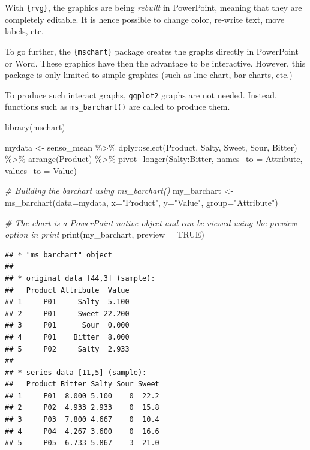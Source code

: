 \documentclass[
]{krantz}
\makeatletter
\newenvironment{Shaded}{\begin{snugshade}}{\end{snugshade}}
\newcommand{\AttributeTok}[1]{\textcolor[rgb]{0.61,0.61,0.61}{#1}}
\newcommand{\CommentTok}[1]{\textcolor[rgb]{0.37,0.37,0.37}{\textit{#1}}}
\newcommand{\ConstantTok}[1]{\textcolor[rgb]{0,0,0}{#1}}
\newcommand{\FunctionTok}[1]{\textcolor[rgb]{0,0,0}{#1}}
\newcommand{\NormalTok}[1]{#1}
\newcommand{\OtherTok}[1]{\textcolor[rgb]{0.37,0.37,0.37}{#1}}
\newcommand{\SpecialCharTok}[1]{\textcolor[rgb]{0,0,0}{#1}}
\newcommand{\StringTok}[1]{\textcolor[rgb]{0.5,0.5,0.5}{#1}}
\newenvironment{kframe}{%
\medskip{}
\setlength{\fboxsep}{.8em}
 \def\at@end@of@kframe{}%
 \ifinner\ifhmode%
  \def\at@end@of@kframe{\end{minipage}}%
  \begin{minipage}{\columnwidth}%
 \fi\fi%
 \def\FrameCommand##1{\hskip\@totalleftmargin \hskip-\fboxsep
 \colorbox{shadecolor}{##1}\hskip-\fboxsep
     \hskip-\linewidth \hskip-\@totalleftmargin \hskip\columnwidth}%
 \MakeFramed {\advance\hsize-\width
   \@totalleftmargin\z@ \linewidth\hsize
   \@setminipage}}%
 {\par\unskip\endMakeFramed%
 \at@end@of@kframe}
\renewenvironment{Shaded}{\begin{kframe}}{\end{kframe}}
\makeatother
\begin{document}
With \texttt{\{rvg\}}, the graphics are being \emph{rebuilt} in PowerPoint, meaning that they are completely editable. It is hence possible to change color, re-write text, move labels, etc.

To go further, the \texttt{\{mschart\}} package creates the graphs directly in PowerPoint or Word. These graphics have then the advantage to be interactive. However, this package is only limited to simple graphics (such as line chart, bar charts, etc.)

To produce such interact graphs, \texttt{ggplot2} graphs are not needed. Instead, functions such as \texttt{ms\_barchart()} are called to produce them.

\begin{Shaded}
\begin{Highlighting}[]
\FunctionTok{library}\NormalTok{(mschart)}

\NormalTok{mydata }\OtherTok{\textless{}{-}}\NormalTok{ senso\_mean }\SpecialCharTok{\%\textgreater{}\%}
\NormalTok{  dplyr}\SpecialCharTok{::}\FunctionTok{select}\NormalTok{(Product, Salty, Sweet, Sour, Bitter) }\SpecialCharTok{\%\textgreater{}\%} 
  \FunctionTok{arrange}\NormalTok{(Product) }\SpecialCharTok{\%\textgreater{}\%} 
  \FunctionTok{pivot\_longer}\NormalTok{(Salty}\SpecialCharTok{:}\NormalTok{Bitter, }\AttributeTok{names\_to =} \StringTok{\textquotesingle{}Attribute\textquotesingle{}}\NormalTok{, }\AttributeTok{values\_to =} \StringTok{\textquotesingle{}Value\textquotesingle{}}\NormalTok{)}

\CommentTok{\# Building the barchart using ms\_barchart()}
\NormalTok{my\_barchart }\OtherTok{\textless{}{-}} \FunctionTok{ms\_barchart}\NormalTok{(}\AttributeTok{data=}\NormalTok{mydata, }\AttributeTok{x=}\StringTok{"Product"}\NormalTok{, }\AttributeTok{y=}\StringTok{"Value"}\NormalTok{, }\AttributeTok{group=}\StringTok{"Attribute"}\NormalTok{)}

\CommentTok{\# The chart is a PowerPoint native object and can be viewed using the preview option in print}
\FunctionTok{print}\NormalTok{(my\_barchart, }\AttributeTok{preview =} \ConstantTok{TRUE}\NormalTok{)}
\end{Highlighting}
\end{Shaded}

\begin{verbatim}
## * "ms_barchart" object
## 
## * original data [44,3] (sample):
##   Product Attribute  Value
## 1     P01     Salty  5.100
## 2     P01     Sweet 22.200
## 3     P01      Sour  0.000
## 4     P01    Bitter  8.000
## 5     P02     Salty  2.933
## 
## * series data [11,5] (sample):
##   Product Bitter Salty Sour Sweet
## 1     P01  8.000 5.100    0  22.2
## 2     P02  4.933 2.933    0  15.8
## 3     P03  7.800 4.667    0  10.4
## 4     P04  4.267 3.600    0  16.6
## 5     P05  6.733 5.867    3  21.0
\end{verbatim}
\end{document}

